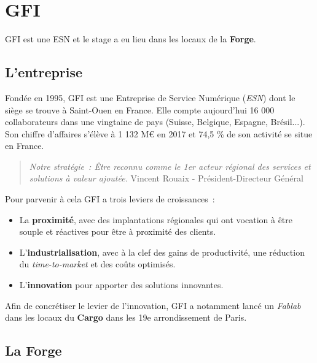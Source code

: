 \section{GFI}

GFI est une ESN et le stage a eu lieu dans les locaux de la \textbf{Forge}.
\subsection{L'entreprise}

Fondée en 1995, GFI est une Entreprise de Service Numérique (\textit{ESN}) dont le siège se trouve à Saint-Ouen en France. Elle compte aujourd'hui 16 000 collaborateurs dans une vingtaine de pays (Suisse, Belgique, Espagne, Brésil...). Son chiffre d'affaires s'élève à 1 132 M€ en 2017 et 74,5 \% de son activité se situe en France.
\begin{quotation}
\textit{Notre stratégie~: Être reconnu comme le 1er acteur régional des services et solutions à valeur ajoutée.
}
Vincent Rouaix - Président-Directeur Général
\end{quotation}
Pour parvenir à cela GFI a trois leviers de croissances~: 
\begin{itemize}
\item La \textbf{proximité}, avec des implantations régionales qui ont vocation à être souple et réactives pour être à proximité des clients.
\item L'\textbf{industrialisation}, avec à la clef des gains de productivité, une réduction du\textit{ time-to-market} et des coûts optimisés.
\item L'\textbf{innovation} pour apporter des solutions innovantes.
\end{itemize}

Afin de concrétiser le levier de l'innovation, GFI a notamment lancé un \textit{Fablab} dans les locaux du \textbf{Cargo} dans les 19e arrondissement de Paris.

\subsection{La Forge}

